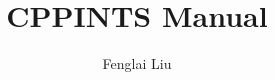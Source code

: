 \documentclass[a4paper,12pt,oneside]{book}
\author{Fenglai Liu}
\title{CPPINTS Manual}
\begin{document}
\maketitle
\tableofcontents

\graphicspath{{figure/}}
\setlength\parindent{0pt}






\end{document}
